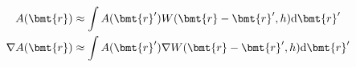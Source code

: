 \begin{frame}
\begin{columns}[T]
\begin{column}{.6\textwidth}
            \begin{figure}[h]
                \centering
                \def\svgwidth{0.5\textwidth}
                
                \label{fig: function and fields}
            \end{figure}

            \begin{align}
                    A(\bmt{r}) &\approx \int A(\bmt{r}') W(\bmt{r}-\bmt{r}', h) \mathrm{d}\bmt{r}' \\
                    \nabla A(\bmt{r}) &\approx \int A(\bmt{r}') \nabla W(\bmt{r}-\bmt{r}', h) \mathrm{d}\bmt{r}'
            \end{align}
        \end{column}
    \end{columns}
\end{frame}

